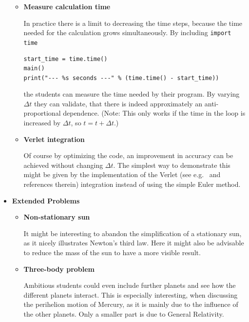 \documentclass[12pt,ngerman,american]{iopart}
\begin{document}
\begin{itemize}
\begin{itemize}
\item \textbf{Measure calculation time}

In practice there is a limit to decreasing the time steps, because the time needed for the calculation grows simultaneously.
By including \texttt{import time}
\begin{lstlisting}
start_time = time.time()
main()
print("--- %s seconds ---" % (time.time() - start_time))
\end{lstlisting}
the students can measure the time needed by their program.
By varying $\Delta t$ they can validate, that there is indeed approximately an anti-proportional dependence.
(Note: This only works if the time in the loop is increased by $\Delta t$, so $t=t+\Delta t$.)
\item \textbf{Verlet integration}

Of course by optimizing the code, an improvement in accuracy can be achieved without changing $\Delta t$.
The simplest way to demonstrate this might be given by the implementation of the Verlet (see e.g.~\cite{Hairer03geometricnumerical} and references therein) integration instead of using the simple Euler method.
\end{itemize}

\item \textbf{Extended Problems}

\begin{itemize}
\item \textbf{Non-stationary sun}

It might be interesting to abandon the simplification of a stationary sun, as it nicely illustrates Newton's third law.
Here it might also be advisable to reduce the mass of the sun to have a more visible result.

\item \textbf{Three-body problem}

Ambitious students could even include further planets and see how the different planets interact.
This is especially interesting, when discussing the perihelion motion of Mercury, as it is mainly due to the influence of the other planets.
Only a smaller part is due to General Relativity.

\end{itemize}

\end{itemize}

\end{document}
